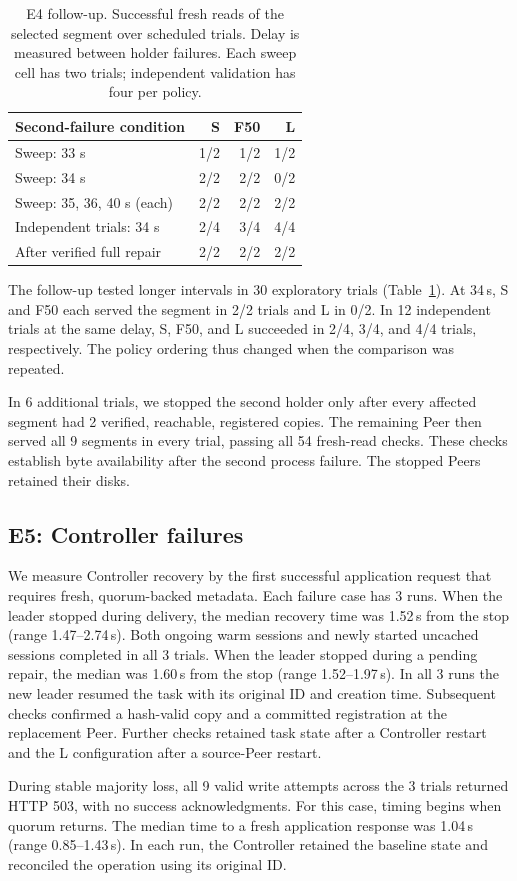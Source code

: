 \begin{table}[ht]
\centering\small
\caption{E4 follow-up. Successful fresh reads of the selected segment
over scheduled trials. Delay is measured between holder failures.
Each sweep cell has two trials; independent validation has four per policy.}
\label{tab:e4}
\begin{tabular}{@{}lrrr@{}}
\toprule
Second-failure condition & S & F50 & L \\
\midrule
Sweep: 33 s & 1/2 & 1/2 & 1/2 \\
Sweep: 34 s & 2/2 & 2/2 & 0/2 \\
Sweep: 35, 36, 40 s (each) & 2/2 & 2/2 & 2/2 \\
Independent trials: 34 s & 2/4 & 3/4 & 4/4 \\
After verified full repair & 2/2 & 2/2 & 2/2 \\
\bottomrule
\end{tabular}
\end{table}

The follow-up tested longer intervals in 30 exploratory trials
(Table~\ref{tab:e4}). At 34\,s, S and F50 each served the segment in
2/2 trials and L in 0/2. In 12 independent trials at the same delay,
S, F50, and L succeeded in 2/4, 3/4, and 4/4 trials, respectively.
The policy ordering thus changed when the comparison was repeated.

In 6 additional trials, we stopped the second holder only after every
affected segment had 2 verified, reachable, registered copies.
The remaining Peer then served all 9 segments in every trial,
passing all 54 fresh-read checks. These checks establish byte
availability after the second process failure. The stopped Peers
retained their disks.

\subsection{E5: Controller failures}
We measure Controller recovery by the first successful application request
that requires fresh, quorum-backed metadata. Each failure case has 3 runs.
When the leader stopped during delivery, the median recovery time was
1.52\,s from the stop (range 1.47--2.74\,s). Both ongoing warm sessions
and newly started uncached sessions completed in all 3 trials.
When the leader stopped during a pending repair,
the median was 1.60\,s from the stop (range 1.52--1.97\,s). In all
3 runs the new leader resumed the task with its original ID and creation
time. Subsequent checks confirmed a hash-valid copy and a committed
registration at the replacement Peer.
Further checks retained task state after a Controller restart and
the L configuration after a source-Peer restart.

During stable majority loss, all 9 valid write attempts across the 3 trials
returned HTTP 503, with no success acknowledgments.
For this case, timing begins when quorum returns. The median time to a
fresh application response was 1.04\,s (range 0.85--1.43\,s). In each
run, the Controller retained the baseline state and reconciled the
operation using its original ID.
